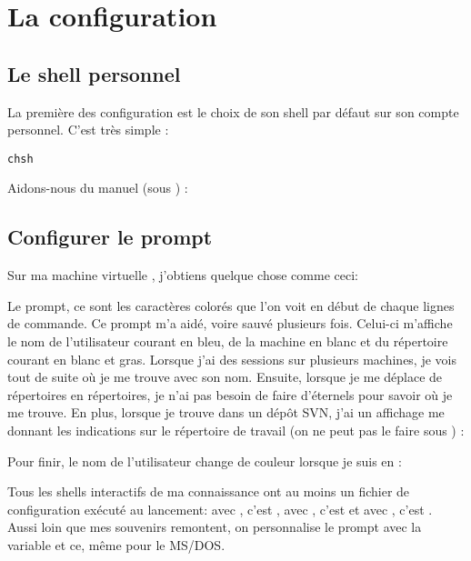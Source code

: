 
\section{La configuration}
\subsection{Le shell personnel}
La première des configuration est le choix de son shell par défaut sur son compte personnel. C'est très simple :

\lstset{style=shell}
\begin{lstlisting}
chsh
\end{lstlisting}

Aidons-nous du manuel (sous \netbsd) :


\subsection{Configurer le prompt}

Sur ma machine virtuelle \netbsd, j'obtiens quelque chose comme ceci:


Le prompt, ce sont les caractères colorés que l'on voit en début de chaque lignes de commande. Ce prompt m'a aidé, voire sauvé plusieurs fois.  Celui-ci m'affiche le nom de l'utilisateur courant en bleu, de la machine en blanc et du répertoire courant en blanc et gras. Lorsque j'ai des sessions sur plusieurs machines, je vois tout de suite où je me trouve avec son nom. Ensuite, lorsque je me déplace de répertoires en répertoires, je n'ai pas besoin de faire d'éternels  pour savoir où je me trouve. En plus, lorsque je trouve dans un dépôt SVN, j'ai un affichage me donnant les indications sur le répertoire de travail (on ne peut pas le faire sous \cygwin) :


Pour finir, le nom de l'utilisateur change de couleur lorsque je suis en  :


Tous les shells interactifs de ma connaissance ont au moins un fichier de configuration exécuté au lancement: avec \zsh, c'est , avec \bash, c'est  et avec \csh, c'est . Aussi loin que mes souvenirs remontent, on personnalise le prompt avec la variable  et ce, même pour le MS/DOS.

